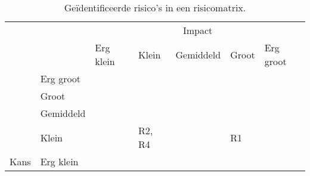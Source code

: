 \documentclass[dutch]{article}
\begin{document}
\begin{table}[!h]
    \begin{tabular}{ll|lllll|}
        \cline{3-7}
                                                     & \multicolumn{1}{c|}{} & \multicolumn{5}{c|}{Impact}                                                                                                                                                                      \\ \cline{3-7}
                                                     &                       & \multicolumn{1}{l|}{Erg klein}          & \multicolumn{1}{l|}{Klein}                    & \multicolumn{1}{l|}{Gemiddeld}          & \multicolumn{1}{l|}{Groot}              & Erg groot          \\ \hline
        \multicolumn{1}{|l|}{}                       & Erg groot             & \multicolumn{1}{l|}{\cellcolor{orange}} & \multicolumn{1}{l|}{\cellcolor{red}}          & \multicolumn{1}{l|}{\cellcolor{red}}    & \multicolumn{1}{l|}{\cellcolor{purple}} & \cellcolor{purple} \\ \cline{2-7}
        \multicolumn{1}{|l|}{}                       & Groot                 & \multicolumn{1}{l|}{\cellcolor{orange}} & \multicolumn{1}{l|}{\cellcolor{orange}}       & \multicolumn{1}{l|}{\cellcolor{red}}    & \multicolumn{1}{l|}{\cellcolor{purple}} & \cellcolor{purple} \\ \cline{2-7}
        \multicolumn{1}{|l|}{}                       & Gemiddeld             & \multicolumn{1}{l|}{\cellcolor{green}}  & \multicolumn{1}{l|}{\cellcolor{orange}}       & \multicolumn{1}{l|}{\cellcolor{red}}    & \multicolumn{1}{l|}{\cellcolor{red}}    & \cellcolor{purple} \\ \cline{2-7}
        \multicolumn{1}{|l|}{}                       & Klein                 & \multicolumn{1}{l|}{\cellcolor{green}}  & \multicolumn{1}{l|}{\cellcolor{orange}R2, R4} & \multicolumn{1}{l|}{\cellcolor{orange}} & \multicolumn{1}{l|}{\cellcolor{red}R1}  & \cellcolor{red}    \\ \cline{2-7}
        \multicolumn{1}{|l|}{\multirow{-5}{*}{Kans}} & Erg klein             & \multicolumn{1}{l|}{\cellcolor{green}}  & \multicolumn{1}{l|}{\cellcolor{green}}        & \multicolumn{1}{l|}{\cellcolor{orange}} & \multicolumn{1}{l|}{\cellcolor{orange}} & \cellcolor{red}    \\ \hline
    \end{tabular}
    \caption{\label{tab:risks-table}Geïdentificeerde risico's in een risicomatrix.}
\end{table}
\end{document}

